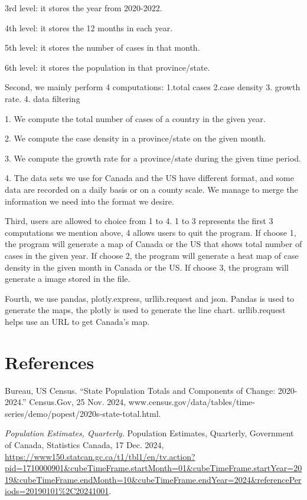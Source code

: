 \documentclass[fontsize=11pt]{article}
\begin{document}
        3rd level: it stores the year from 2020-2022.
        
        4th level: it stores the 12 months in each year.
        
        5th level: it stores the number of cases in that month.
        
        6th level: it stores the population in that province/state.
        
Second, we mainly perform 4 computations: 1.total cases 2.case density 3. growth rate. 4. data filtering

        1. We compute the total number of cases of a country in the given year.

        2. We compute the case density in a province/state on the given month.

        3. We compute the growth rate for a province/state during the given time period.

        4. The data sets we use for Canada and the US have different format, and some data are recorded on a daily basis or on a county scale. We manage to merge the information we need into the format we desire.

Third, users are allowed to choice from 1 to 4. 1 to 3 represents the first 3 computations we mention above, 4 allows users to quit the program. If choose 1, the program will generate a map of Canada or the US that shows total number of cases in the given year. If choose 2, the program will generate a heat map of case density in the given month in Canada or the US. If choose 3, the program will generate a image stored in the file.

Fourth, we use pandas, plotly.express, urllib.request and json. Pandas is used to generate the maps, the plotly is used to generate the line chart. urllib.request helps use an URL to get Canada's map.
\section*{References}

Bureau, US Census. “State Population Totals and Components of Change: 2020-2024.” Census.Gov, 25 Nov. 2024, www.census.gov/data/tables/time-series/demo/popest/2020s-state-total.html.


\textit{Population Estimates, Quarterly.} Population Estimates, Quarterly, Government of Canada, Statistics Canada, 17 Dec. 2024, \url{https://www150.statcan.gc.ca/t1/tbl1/en/tv.action?pid=1710000901&cubeTimeFrame.startMonth=01&cubeTimeFrame.startYear=2019&cubeTimeFrame.endMonth=10&cubeTimeFrame.endYear=2024&referencePeriods=20190101%2C20241001}.
\end{document}
